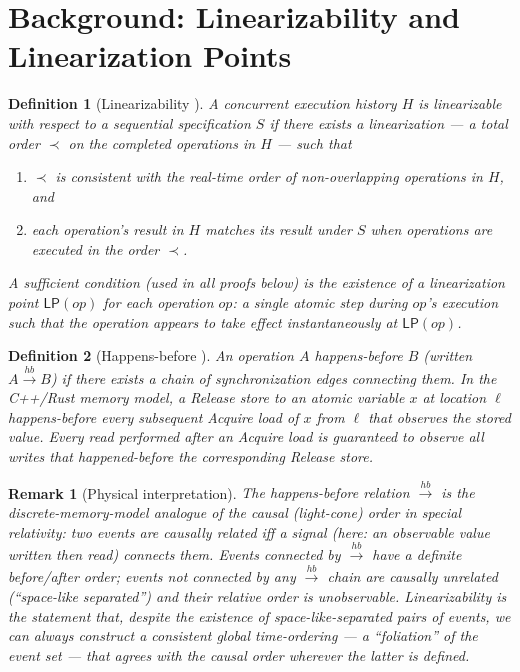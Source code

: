 \documentclass[11pt,a4paper]{article}
\newtheorem{definition}{Definition}[section]
\newtheorem{remark}{Remark}[section]
\newcommand{\LP}[1]{\mathsf{LP}(#1)}
\begin{document}
\section{Background: Linearizability and Linearization Points}

\begin{definition}[Linearizability \cite{herlihy_wing1990}]
A concurrent execution history $H$ is \emph{linearizable} with
respect to a sequential specification $S$ if there exists a
\emph{linearization} --- a total order $\prec$ on the completed
operations in $H$ --- such that
\begin{enumerate}
  \item $\prec$ is consistent with the real-time order of
        non-overlapping operations in $H$, and
  \item each operation's result in $H$ matches its result under $S$
        when operations are executed in the order $\prec$.
\end{enumerate}
A sufficient condition (used in all proofs below) is the existence
of a \emph{linearization point} $\LP{op}$ for each operation $op$:
a single atomic step \emph{during} $op$'s execution such that the
operation appears to take effect instantaneously at $\LP{op}$.
\end{definition}

\begin{definition}[Happens-before \cite{boehm2008}]
\label{def:hb}
An operation $A$ \emph{happens-before} $B$ (written
$A \xrightarrow{hb} B$) if there exists a chain of
synchronization edges connecting them.  In the C++/Rust memory
model, a \emph{Release store} to an atomic variable $x$ at location
$\ell$ happens-before every subsequent \emph{Acquire load} of $x$
from $\ell$ that observes the stored value.  Every read performed
after an Acquire load is guaranteed to observe all writes that
happened-before the corresponding Release store.
\end{definition}

\begin{remark}[Physical interpretation]
The happens-before relation $\xrightarrow{hb}$ is the
discrete-memory-model analogue of the \emph{causal (light-cone)
order} in special relativity: two events are causally related
iff a signal (here: an observable value written then read) connects
them.  Events connected by $\xrightarrow{hb}$ have a
definite before/after order; events \emph{not} connected by any
$\xrightarrow{hb}$ chain are causally unrelated (``space-like
separated'') and their relative order is unobservable.
Linearizability is the statement that, despite the existence of
space-like-separated pairs of events, we can always construct a
consistent global time-ordering --- a ``foliation'' of the event
set --- that agrees with the causal order wherever the latter is
defined.
\end{remark}
\end{document}
